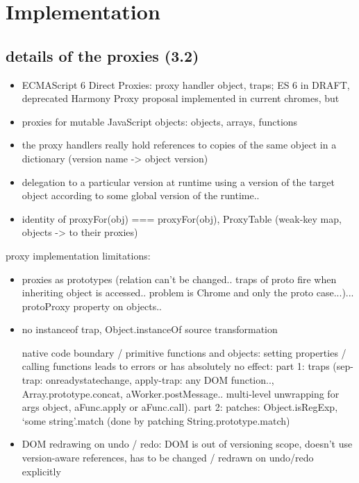 \section{Implementation} \label{sec:IMPLEMENTATION}


\subsection{details of the proxies (3.2)}

\begin{itemize}
    \item ECMAScript 6 Direct Proxies: proxy handler object, traps; ES 6 in DRAFT, deprecated Harmony Proxy proposal implemented in current chromes, but 
    \item proxies for mutable JavaScript objects: objects, arrays, functions
    \item the proxy handlers really hold references to copies of the same object in a dictionary (version name -> object version)
    \item delegation to a particular version at runtime using a version of the target object according to some global version of the runtime..
    \item identity of proxyFor(obj) === proxyFor(obj), ProxyTable (weak-key map, objects -> to their proxies)
\end{itemize}



proxy implementation limitations: 
\begin{itemize}
    \item proxies as prototypes (relation can’t be changed.. traps of proto fire when inheriting object is accessed.. problem is Chrome and only the proto case...)... protoProxy property on objects..
    \item no instanceof trap, Object.instanceOf source transformation 
    \item [native code] boundary / primitive functions and objects: setting properties / calling functions leads to errors or has absolutely no effect: part 1: traps (sep-trap: onreadystatechange, apply-trap: any DOM function.., Array.prototype.concat, aWorker.postMessage.. multi-level unwrapping for args object, aFunc.apply or aFunc.call).
part 2: patches: Object.isRegExp, ‘some string’.match (done by patching String.prototype.match)
\end{itemize}


\begin{itemize}
    \item DOM redrawing on undo / redo: DOM is out of versioning scope, doesn’t use version-aware references, has to be changed / redrawn on undo/redo explicitly
\end{itemize}




